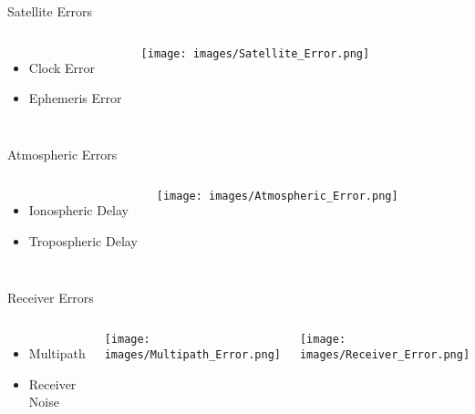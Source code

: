 \documentclass[12pt, compress, xcolor=table]{beamer}
\begin{document}
\begin{frame}{Satellite Errors}
 \begin{columns}
  \begin{itemize}
  \setlength\itemsep{0.5cm}
   \item Clock Error
   \item Ephemeris Error
  \end{itemize}

  \texttt{[image: images/Satellite\_Error.png]}
  
 \end{columns}
\end{frame}

\begin{frame}{Atmospheric Errors}
 \begin{columns}
  \begin{itemize}
  \setlength\itemsep{0.5cm}
   \item Ionospheric Delay
   \item Tropospheric Delay
  \end{itemize}

  \texttt{[image: images/Atmospheric\_Error.png]}
  
 \end{columns}
\end{frame}

\begin{frame}{Receiver Errors}
 \begin{columns}
  \begin{itemize}
  \setlength\itemsep{0.5cm}
   \item Multipath
   \item Receiver Noise
  \end{itemize}

  \texttt{[image: images/Multipath\_Error.png]}
  
  \hspace{1cm}
  
  \texttt{[image: images/Receiver\_Error.png]}
  
 \end{columns}
\end{frame}
\end{document}

